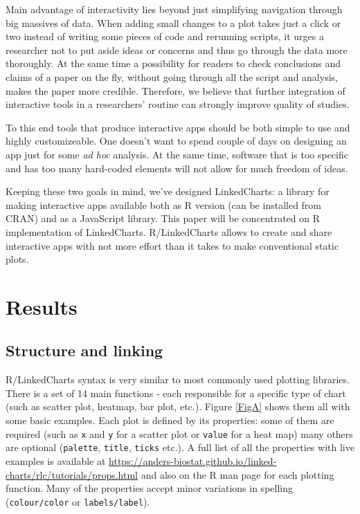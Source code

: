\documentclass[twocolumn,10pt]{article}
\begin{document}
Main advantage of interactivity lies beyond just simplifying navigation through big massives of data. When adding small changes to a plot takes just a click or two instead of writing some pieces of code and rerunning scripts, it urges a researcher not to put aside ideas or concerns and thus go through the data more thoroughly. At the same time a possibility for readers to check conclusions and claims of a paper on the fly, without going through all the script and analysis, makes the paper more credible. Therefore, we believe that further integration of interactive tools in a researchers' routine can strongly improve quality of studies.

To this end tools that produce interactive apps should be both simple to use and highly customizeable. One doesn't want to spend couple of days on designing an app just for some \emph{ad hoc} analysis. At the same time, software that is too specific and has too many hard-coded elements will not allow for much freedom of ideas.

Keeping these two goals in mind, we've designed LinkedCharts: a library for making interactive apps available both as R version (can be installed from CRAN) and as a JavaScript library. This paper will be concentrated on R implementation of LinkedCharts. R/LinkedCharts allows to create and share interactive apps with not more effort than it takes to make conventional static plots.

\section{Results}
\subsection{Structure and linking}
R/LinkedCharts syntax is very similar to most commonly used plotting libraries. There is a set of 14 main functions - each responsible for a specific type of chart (such as scatter plot, heatmap, bar plot, etc.). Figure \ref{FigA} shows them all with some basic examples. Each plot is defined by its properties: some of them are required (such as \texttt{x} and \texttt{y} for a scatter plot or \texttt{value} for a heat map) many others are optional (\texttt{palette}, \texttt{title}, \texttt{ticks} etc.). A full list of all the properties with live examples is available at \url{https://anders-biostat.github.io/linked-charts/rlc/tutorials/props.html} and also on the R man page for each plotting function. Many of the properties accept minor variations in spelling (\texttt{colour/color} or \texttt{labels/label}).
\end{document}
